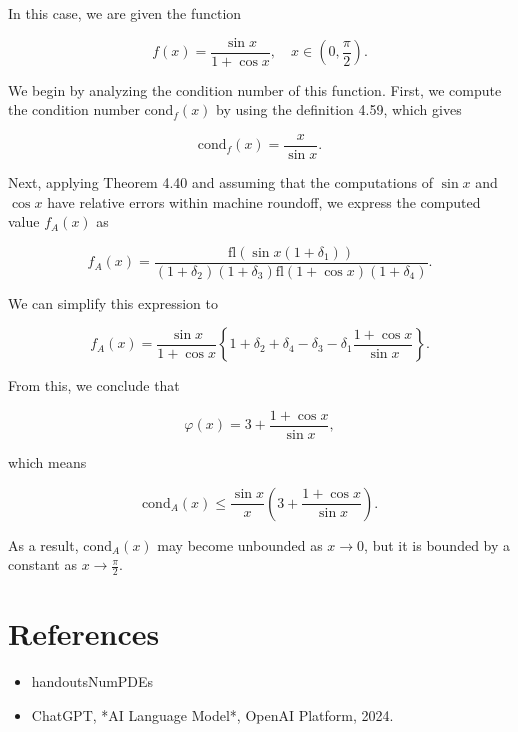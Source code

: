 \documentclass[a4paper]{article}
\begin{document}
In this case, we are given the function

\[
f(x) = \frac{\sin x}{1 + \cos x}, \quad x \in (0, \frac{\pi}{2}).
\]

We begin by analyzing the condition number of this function. First, we compute the condition number \( \text{cond}_f(x) \) by using the definition 4.59, which gives

\[
\text{cond}_f(x) = \frac{x}{\sin x}.
\]

Next, applying Theorem 4.40 and assuming that the computations of \( \sin x \) and \( \cos x \) have relative errors within machine roundoff, we express the computed value \( f_A(x) \) as

\[
f_A(x) = \frac{\text{fl}(\sin x (1 + \delta_1))}{(1 + \delta_2) (1 + \delta_3) \text{fl}(1 + \cos x)(1 + \delta_4)}.
\]

We can simplify this expression to

\[
f_A(x) = \frac{\sin x}{1 + \cos x} \left\{ 1 + \delta_2 + \delta_4 - \delta_3 - \delta_1 \frac{1 + \cos x}{\sin x} \right\}.
\]

From this, we conclude that

\[
\varphi(x) = 3 + \frac{1 + \cos x}{\sin x},
\]

which means

\[
\text{cond}_A(x) \leq \frac{\sin x}{x} \left( 3 + \frac{1 + \cos x}{\sin x} \right).
\]

As a result, \( \text{cond}_A(x) \) may become unbounded as \( x \to 0 \), but it is bounded by a constant as \( x \to \frac{\pi}{2} \).

\section*{References}
\begin{itemize}
   \item handoutsNumPDEs
   \item ChatGPT, *AI Language Model*, OpenAI Platform, 2024.
\end{itemize}
\end{document}
